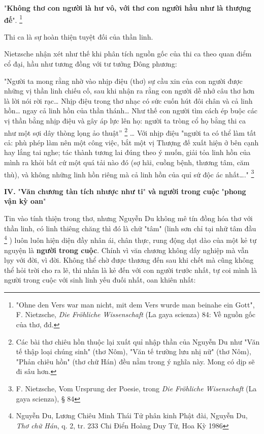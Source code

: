 \documentclass[../main.tex]{subfiles}
\begin{document}
\begin{multicols}{2}
"\textbf{Không thơ con người là hư vô, với thơ con người hầu như là thượng đế}". \footnote{
"Ohne den Vers war man nicht, mit dem Vers wurde man beinahe ein Gott", F. Nietzsche, \textit{Die Fröhliche Wissenschaft }(La gaya scienza) 84: Về nguồn gốc của thơ, đd.}  
 
Thi ca là sự hoàn thiện tuyệt đối của thần linh. 
 
Nietzsche nhận xét như thế khi phân tích nguồn gốc của thi ca theo quan điểm cổ đại, hầu như tương đồng với tư tưởng Đông phương: 
 
"Người ta mong rằng nhờ vào nhịp điệu (thơ) sự cầu xin của con người được những vị thần linh chiếu cố, sau khi nhận ra rằng con người dễ nhớ câu thơ hơn là lời nói rời rạc… Nhịp điệu trong thơ nhạc có sức cuốn hút đôi chân và cả linh hồn… ngay cả linh hồn của thần thánh… Như thế con người tìm cách ép buộc các vị thần bằng nhịp điệu và gây áp lực lên họ: người ta tròng cổ họ bằng thi ca như một sợi dây thòng lọng ảo thuật” \footnote{
Các bài thơ chiêu hồn thuộc lại xuất quỉ nhập thần của Nguyễn Du như "Văn tế thập loại chúng sinh" (thơ Nôm), "Văn tế trường lưu nhị nữ" (thơ Nôm), "Phản chiêu hồn" (thơ chữ Hán) đều nằm trong ý nghĩa này. Mong có dịp sẽ đi sâu hơn.} … Với nhịp điệu "người ta có thể làm tất cả: phù phép làm nên một công việc, bắt một vị Thượng đế xuất hiện ở bên cạnh hay lắng tai nghe; tác thành tương lai đúng theo ý muốn, giải tỏa linh hồn của mình ra khỏi bất cứ một quá tải nào đó (sợ hãi, cuồng bệnh, thương tâm, căm thù), và không những linh hồn riêng mà cả linh hồn của quỉ sứ độc ác nhất…." \footnote{
F. Nietzsche, Vom Ursprung der Poesie, trong \textit{Die Fröhliche Wisenschaft} (La gaya scienza), § 84}  
 
 
\textbf{IV. }"\textbf{Văn chương tàn tích nhược như ti}"\textbf{ và người trong cuộc }"\textbf{phong vận kỳ oan}" 
 
Tin vào tính thiện trong thơ, nhưng Nguyễn Du không mê tín đồng hóa thơ với thần linh, có linh thiêng chăng thì đó là chữ "tâm" (linh sơn chỉ tại nhữ tâm đầu \footnote{
Nguyễn Du, Lương Chiêu Minh Thái Tử phân kinh Phật đài, Nguyễn Du, \textit{Thơ chữ Hán}, q. 2, tr. 233  
Chi Điển Hoàng Duy Từ, Hoa Kỳ 1986} ) luôn luôn hiện diện đầy nhân ái, chân thực, rung động dạt dào của một kẻ tự nguyện là \textbf{người trong cuộc}. Chính vì văn chương không dấy nghiệp mà vẫn lụy với đời, vì đời. Không thể chờ được thương đến sau khi chết mà cũng không thể hỏi trời cho ra lẽ, thi nhân là kẻ đến với con người trước nhất, tự coi mình là người trong cuộc với sinh linh yếu đuối nhất, oan khiên nhất: 
\begin{blockquote}
        

\end{blockquote}
\end{multicols}
\end{document}
